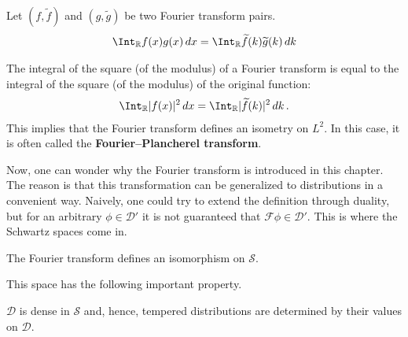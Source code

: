     \begin{theorem}[Parceval]\label{distributions:parcevals_theorem}
        Let $(f,\widetilde{f})$ and $(g,\widetilde{g})$ be two Fourier transform pairs.
        \begin{gather}
            \Int_{\mathbb{R}} f(x)g(x)\,dx = \Int_{\mathbb{R}}\widetilde{f}(k)\widetilde{g}(k)\,dk
        \end{gather}
    \end{theorem}
    \begin{result}[Plancherel]\label{distributions:plancherel_theorem}
        The integral of the square (of the modulus) of a Fourier transform is equal to the integral of the square (of the modulus) of the original function:
        \begin{gather}
            \Int_{\mathbb{R}}|f(x)|^2\,dx = \Int_{\mathbb{R}}|\widetilde{f}(k)|^2\,dk\,.
        \end{gather}
        This implies that the Fourier transform defines an isometry on $L^2$. In this case, it is often called the \textbf{Fourier--Plancherel transform}.
    \end{result}

    Now, one can wonder why the Fourier transform is introduced in this chapter. The reason is that this transformation can be generalized to distributions in a convenient way. Naively, one could try to extend the definition through duality, but for an arbitrary $\phi\in\mathcal{D}'$ it is not guaranteed that $\mathcal{F}\phi\in\mathcal{D}'$. This is where the Schwartz spaces come in.
    \begin{property}
        The Fourier transform defines an isomorphism on $\mathscr{S}$.
    \end{property}


    This space has the following important property.
    \begin{property}
        $\mathcal{D}$ is dense in $\mathscr{S}$ and, hence, tempered distributions are determined by their values on $\mathcal{D}$.
    \end{property}

